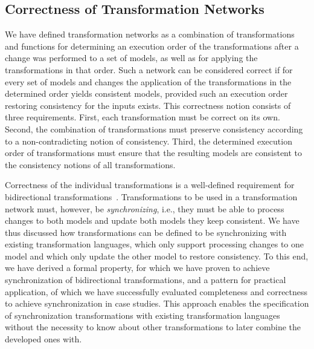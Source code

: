 \subsection{Correctness of Transformation Networks}

We have defined transformation networks as a combination of transformations and functions for determining an execution order of the transformations after a change was performed to a set of models, as well as for applying the transformations in that order.
Such a network can be considered correct if for every set of models and changes the application of the transformations in the determined order yields consistent models, provided such an execution order restoring consistency for the inputs exists.
This correctness notion consists of three requirements.
First, each transformation must be correct on its own. Second, the combination of transformations must preserve consistency according to a non-contradicting notion of consistency. Third, the determined execution order of transformations must ensure that the resulting models are consistent to the consistency notions of all transformations.

Correctness of the individual transformations is a well-defined requirement for bidirectional transformations~\cite{stevens2010sosym}.
Transformations to be used in a transformation network must, however, be \emph{synchronizing}, i.e., they must be able to process changes to both models and update both models they keep consistent.
We have thus discussed how transformations can be defined to be synchronizing with existing transformation languages, which only support processing changes to one model and which only update the other model to restore consistency.
To this end, we have derived a formal property, for which we have proven to achieve synchronization of bidirectional transformations, and a pattern for practical application, of which we have successfully evaluated completeness and correctness to achieve synchronization in case studies.
This approach enables the specification of synchronization transformations with existing transformation languages without the necessity to know about other transformations to later combine the developed ones with.

